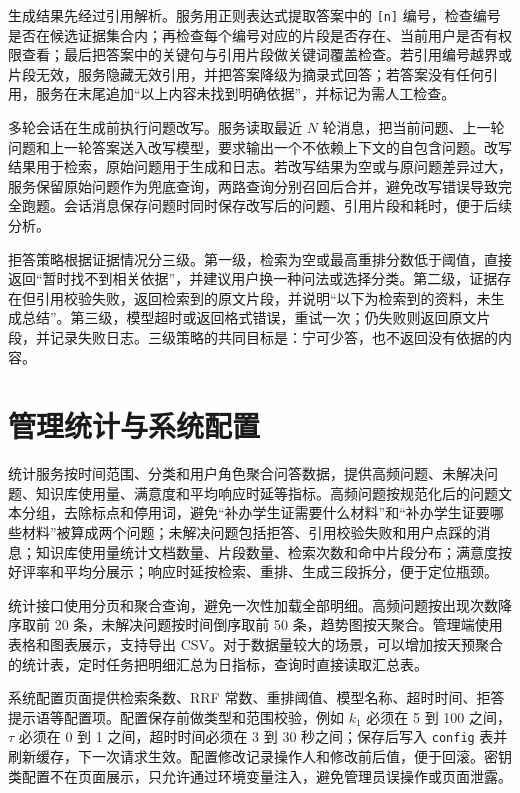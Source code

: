 生成结果先经过引用解析。服务用正则表达式提取答案中的 \texttt{[n]} 编号，检查编号是否在候选证据集合内；再检查每个编号对应的片段是否存在、当前用户是否有权限查看；最后把答案中的关键句与引用片段做关键词覆盖检查。若引用编号越界或片段无效，服务隐藏无效引用，并把答案降级为摘录式回答；若答案没有任何引用，服务在末尾追加“以上内容未找到明确依据”，并标记为需人工检查。

多轮会话在生成前执行问题改写。服务读取最近 $N$ 轮消息，把当前问题、上一轮问题和上一轮答案送入改写模型，要求输出一个不依赖上下文的自包含问题。改写结果用于检索，原始问题用于生成和日志。若改写结果为空或与原问题差异过大，服务保留原始问题作为兜底查询，两路查询分别召回后合并，避免改写错误导致完全跑题。会话消息保存问题时同时保存改写后的问题、引用片段和耗时，便于后续分析。

拒答策略根据证据情况分三级。第一级，检索为空或最高重排分数低于阈值，直接返回“暂时找不到相关依据”，并建议用户换一种问法或选择分类。第二级，证据存在但引用校验失败，返回检索到的原文片段，并说明“以下为检索到的资料，未生成总结”。第三级，模型超时或返回格式错误，重试一次；仍失败则返回原文片段，并记录失败日志。三级策略的共同目标是：宁可少答，也不返回没有依据的内容。

\section{管理统计与系统配置}
\label{sec:stats-impl}

统计服务按时间范围、分类和用户角色聚合问答数据，提供高频问题、未解决问题、知识库使用量、满意度和平均响应时延等指标。高频问题按规范化后的问题文本分组，去除标点和停用词，避免“补办学生证需要什么材料”和“补办学生证要哪些材料”被算成两个问题；未解决问题包括拒答、引用校验失败和用户点踩的消息；知识库使用量统计文档数量、片段数量、检索次数和命中片段分布；满意度按好评率和平均分展示；响应时延按检索、重排、生成三段拆分，便于定位瓶颈。

统计接口使用分页和聚合查询，避免一次性加载全部明细。高频问题按出现次数降序取前 20 条，未解决问题按时间倒序取前 50 条，趋势图按天聚合。管理端使用表格和图表展示，支持导出 CSV。对于数据量较大的场景，可以增加按天预聚合的统计表，定时任务把明细汇总为日指标，查询时直接读取汇总表。

系统配置页面提供检索条数、RRF 常数、重排阈值、模型名称、超时时间、拒答提示语等配置项。配置保存前做类型和范围校验，例如 $k_1$ 必须在 5 到 100 之间，$\tau$ 必须在 0 到 1 之间，超时时间必须在 3 到 30 秒之间；保存后写入 \texttt{config} 表并刷新缓存，下一次请求生效。配置修改记录操作人和修改前后值，便于回滚。密钥类配置不在页面展示，只允许通过环境变量注入，避免管理员误操作或页面泄露。

